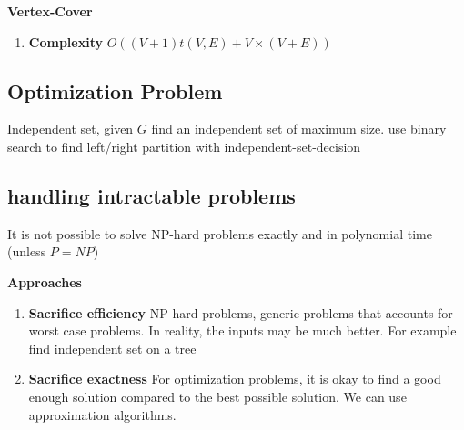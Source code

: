 \documentclass[11pt]{article}
\begin{document}
\begin{example}
    \textbf{Vertex-Cover}

    \begin{enumerate}
        \item \textbf{Complexity} $O((V+1)t(V,E) + V\times(V+E))$
    \end{enumerate}

    \begin{algorithm}[H]

    \end{algorithm}
\end{example}




\subsection*{Optimization Problem} 

Independent set, given $G$ find an independent set of maximum size. use binary search to find left/right partition with independent-set-decision


\subsection*{handling intractable problems}
It is not possible to solve NP-hard problems exactly and in polynomial time (unless $P = NP$)

\begin{defn*}
    \textbf{Approaches}
    \begin{enumerate}
        \item \textbf{Sacrifice efficiency} NP-hard problems, generic problems that accounts for worst case problems. In reality, the inputs may be much better. For example find independent set on a tree
        \item \textbf{Sacrifice exactness} For optimization problems, it is okay to find a good enough solution compared to the best possible solution. We can use approximation algorithms.
    \end{enumerate}
\end{defn*}
\end{document}
